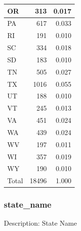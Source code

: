 \documentclass[
]{krantz}
\begin{document}
\begin{tabular}[t]{l|r|r}
OR & 313 & 0.017\\
\hline
PA & 617 & 0.033\\
\hline
RI & 191 & 0.010\\
\hline
SC & 334 & 0.018\\
\hline
SD & 183 & 0.010\\
\hline
TN & 505 & 0.027\\
\hline
TX & 1016 & 0.055\\
\hline
UT & 188 & 0.010\\
\hline
VT & 245 & 0.013\\
\hline
VA & 451 & 0.024\\
\hline
WA & 439 & 0.024\\
\hline
WV & 197 & 0.011\\
\hline
WI & 357 & 0.019\\
\hline
WY & 190 & 0.010\\
\hline
Total & 18496 & 1.000\\
\hline
\end{tabular}

\hypertarget{state_name}{%
\subsubsection*{state\_name}\label{state_name}}


Description: State Name
\end{document}
